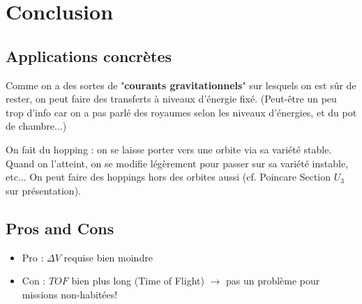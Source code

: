 \documentclass[12pt]{article}
\begin{document}
	
	
	\clearpage
	\section{Conclusion}
	\subsection{Applications concrètes}
	Comme on a des sortes de "\textbf{courants gravitationnels}" sur lesquels on est sûr de rester, on peut faire des transferts à niveaux d'énergie fixé. (Peut-être un peu trop d'info car on a pas parlé des royaumes selon les niveaux d'énergies, et du pot de chambre...)
	
	On fait du hopping : on se laisse porter vers une orbite via sa variété stable. Quand on l'atteint, on se modifie légèrement pour passer sur sa variété instable, etc... On peut faire des hoppings hors des orbites aussi (cf. Poincare Section $U_3$ sur présentation).
	
	\subsection{Pros and Cons}
	\begin{itemize}
		\item Pro : $\Delta V$ requise bien moindre
		\item Con : $TOF$ bien plus long (Time of Flight) $\to$ pas un problème pour missions non-habitées!
	\end{itemize}
	
	
	
	
\end{document}
